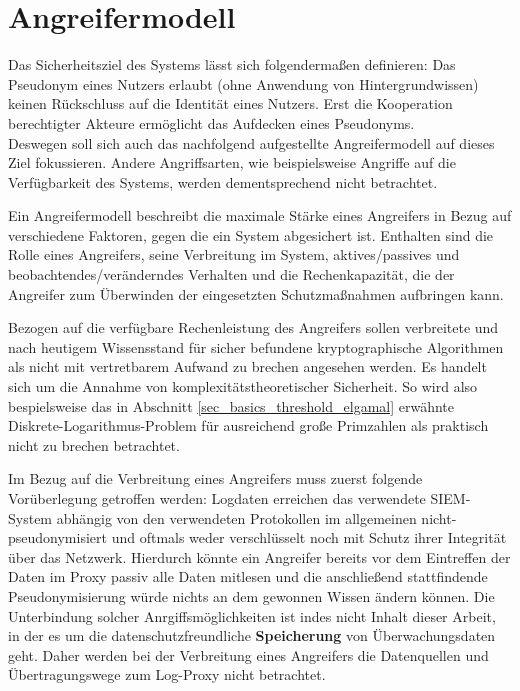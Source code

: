 \section{Angreifermodell}

\label{subsec_impl_requirements_attackermodel}



Das Sicherheitsziel des Systems lässt sich folgendermaßen definieren: Das Pseudonym eines Nutzers erlaubt (ohne Anwendung von Hintergrundwissen) keinen Rückschluss auf die Identität eines Nutzers. Erst die Kooperation berechtigter Akteure ermöglicht das Aufdecken eines Pseudonyms.\\
Deswegen soll sich auch das nachfolgend aufgestellte Angreifermodell auf dieses Ziel fokussieren. Andere Angriffsarten, wie beispielsweise Angriffe auf die Verfügbarkeit des Systems, werden dementsprechend nicht betrachtet.

Ein Angreifermodell beschreibt die maximale Stärke eines Angreifers in Bezug auf verschiedene Faktoren, gegen die ein System abgesichert ist. Enthalten sind die Rolle eines Angreifers, seine Verbreitung im System, aktives/passives und beobachtendes/veränderndes Verhalten und die Rechenkapazität, die der Angreifer zum Überwinden der eingesetzten Schutzmaßnahmen aufbringen kann. \cite{baumann2014kryptographische} 

Bezogen auf die verfügbare Rechenleistung des Angreifers sollen verbreitete und nach heutigem Wissensstand für sicher befundene kryptographische Algorithmen als nicht mit vertretbarem Aufwand zu brechen angesehen werden. Es handelt sich um die Annahme von komplexitätstheoretischer Sicherheit. So wird also bespielsweise das in Abschnitt \ref{sec_basics_threshold_elgamal} erwähnte Diskrete-Logarithmus-Problem für ausreichend große Primzahlen als praktisch nicht zu brechen betrachtet.

Im Bezug auf die Verbreitung eines Angreifers muss zuerst folgende Vorüberlegung getroffen werden: 
Logdaten erreichen das verwendete SIEM-System abhängig von den verwendeten Protokollen im allgemeinen nicht-pseudonymisiert und oftmals weder verschlüsselt noch mit Schutz ihrer Integrität über das Netzwerk. Hierdurch könnte ein Angreifer bereits vor dem Eintreffen der Daten im Proxy passiv alle Daten mitlesen und die anschließend stattfindende Pseudonymisierung würde nichts an dem gewonnen Wissen ändern können.
Die Unterbindung solcher Anrgiffsmöglichkeiten ist indes nicht Inhalt dieser Arbeit, in der es um die datenschutzfreundliche \textbf{Speicherung} von Überwachungsdaten geht. Daher werden bei der Verbreitung eines Angreifers die Datenquellen und Übertragungswege zum Log-Proxy nicht betrachtet.

